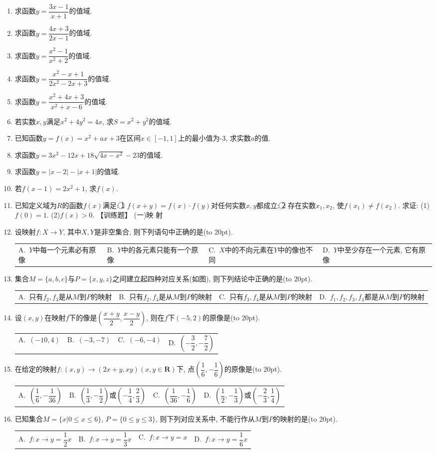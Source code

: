 \documentclass[10pt,a4paper]{article}
\newcommand{\bracket}[1]{(\hbox to #1pt{})}
\newcommand{\fourch}[4]{\par\begin{tabular}{p{.23\textwidth}p{.23\textwidth}p{.23\textwidth}p{.23\textwidth}}
A.~#1 &B.~#2& C.~#3& D.~#4
\end{tabular}}
\begin{document}
\begin{enumerate}[1.]
    \item 求函数$y=\dfrac{3x-1}{x+1}$的值域.
    \item 求函数$y=\dfrac{4x+3}{2x-1}$的值域.
    \item 求函数$y=\dfrac{{x^2}-1}{{x^2}+2}$的值域.
    \item 求函数$y=\dfrac{{x^2}-x+1}{2{x^2}-2x+3}$的值域.
    \item 求函数$y=\dfrac{{x^2}+4x+3}{{x^2}+x-6}$的值域.
    \item 若实数$x,y$满足$x^2+4y^2=4x$, 求$S=x^2+y^2$的值域.
    \item 已知函数$y=f(x)=x^2+ax+3$在区间$x\in [ -1,1 ]$上的最小值为-3, 求实数$a$的值.
    \item 求函数$y=3{x^2}-12x+18\sqrt{4x-{x^2}}-23$的值域.
    \item 求函数$y=|x-2|-|x+1|$的值域.
    \item 若$f(x-1)=2x^2+1$, 求$f(x)$.
    \item 已知定义域为$R$的函数$f(x)$满足:
    \textcircled{1} $f(x+y)=f(x)\cdot f(y)$对任何实数$x,y$都成立;
    \textcircled{2} 存在实数$x_1,x_2$, 使$f(x_1)\ne f(x_2)$.
    求证: (1)$f(0)=1$.
    (2)$f(x)>0$.
    【训练题】
    (一)映  射
    \item 设映射$f:X\to Y$, 其中$X,Y$是非空集合, 则下列语句中正确的是\bracket{20}.
    \fourch{$Y$中每一个元素必有原像}{$Y$中的各元素只能有一个原像}{$X$中的不向元素在$Y$中的像也不同}{$Y$中至少存在一个元素, 它有原像}
    \item 集合$M=\{a,b,c\}$与$P=\{x,y,z\}$之间建立起四种对应关系(如图), 则下列结论中正确的是\bracket{20}.
    \fourch{只有$f_2,f_3$是从$M$到$P$的映射}{只有$f_2,f_4$是从$M$到$P$的映射}{只有$f_3,f_4$是从$M$到$P$的映射}{$f_1,f_2,f_3,f_4$都是从$M$到$P$的映射}
    \item 设$(x,y)$在映射$f$下的像是$(\dfrac{x+y}2,\dfrac{x-y}2)$, 则在$f$下$(-5,2)$的原像是\bracket{20}.
    \fourch{$(-10,4)$}{$(-3,-7)$}{$(-6,-4)$}{$(-\dfrac 32,-\dfrac 72)$}
    \item 在给定的映射$f:(x,y)\to (2x+y,xy)(x,y\in \mathbf{R})$下, 点$(\dfrac 16,-\dfrac 16)$的原像是\bracket{20}.
    \fourch{$(\dfrac 16,-\dfrac 1{36})$}{$(\dfrac 13,-\dfrac 12)$或$(-\dfrac 14,\dfrac 23)$}{$(\dfrac 1{36},-\dfrac 16)$}{$(\dfrac 12,-\dfrac 13)$或$(-\dfrac 23,\dfrac 14)$}
    \item 已知集合$M=\{x|0\le x\le 6\}$, $P=\{0\le y\le 3\}$, 则下列对应关系中, 不能行作从$M$到$P$的映射的是\bracket{20}.
    \fourch{$f:x\to y=\dfrac 12x$}{$f:x\to y=\dfrac 13x$}{$f:x\to y=x$}{$f:x\to y=\dfrac 16x$}

\end{enumerate}
\end{document}
